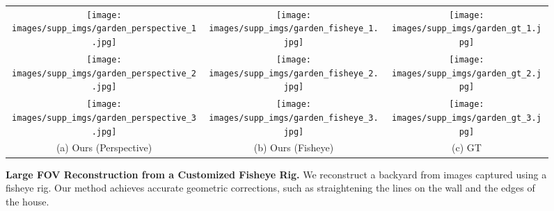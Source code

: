 {
\begin{figure*}[t]
    \centering
    \setlength{\tabcolsep}{1pt} %
    \begin{tabular}{ccc} %
        \texttt{[image: images/supp\_imgs/garden\_perspective\_1.jpg]} &
         \texttt{[image: images/supp\_imgs/garden\_fisheye\_1.jpg]} &
        \texttt{[image: images/supp\_imgs/garden\_gt\_1.jpg]} \\

        \texttt{[image: images/supp\_imgs/garden\_perspective\_2.jpg]} &
         \texttt{[image: images/supp\_imgs/garden\_fisheye\_2.jpg]} &
        \texttt{[image: images/supp\_imgs/garden\_gt\_2.jpg]} \\

        \texttt{[image: images/supp\_imgs/garden\_perspective\_3.jpg]} &
         \texttt{[image: images/supp\_imgs/garden\_fisheye\_3.jpg]} &
        \texttt{[image: images/supp\_imgs/garden\_gt\_3.jpg]} \\

        \multicolumn{1}{c}{(a) Ours (Perspective)} & \multicolumn{1}{c}{(b) Ours (Fisheye)} & \multicolumn{1}{c}{(c) GT}
    \end{tabular}

    \caption{\textbf{Large FOV Reconstruction from a Customized Fisheye Rig.} We reconstruct a backyard from images captured using a fisheye rig. Our method achieves accurate geometric corrections, such as straightening the lines on the wall and the edges of the house.}


    \label{fig:supp_garden}

\end{figure*}
}